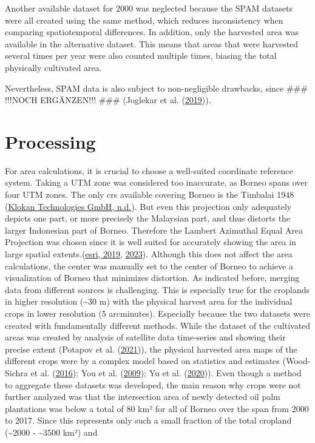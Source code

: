 \documentclass[
  letterpaper,
  DIV=11,
  numbers=noendperiod]{scrreprt}
\begin{document}
Another available dataset for 2000 was neglected because the SPAM
datasets were all created using the same method, which reduces
inconsistency when comparing spatiotemporal differences. In addition,
only the harvested area was available in the alternative dataset. This
means that areas that were harvested several times per year were also
counted multiple times, biasing the total physically cultivated area.

Nevertheless, SPAM data is also subject to non-negligible drawbacks,
since \#\#\# !!!NOCH ERGÄNZEN!!! \#\#\# (Joglekar et al.
(\protect\hyperlink{ref-joglekarPixelatingCropProduction2019}{2019})).

\hypertarget{processing}{%
\section{Processing}\label{processing}}

For area calculations, it is crucial to choose a well-suited coordinate
reference system. Taking a UTM zone was considered too inaccurate, as
Borneo spans over four UTM zones. The only crs available covering Borneo
is the Timbalai 1948
(\protect\hyperlink{ref-klokantechnologiesgmbhTimbalai1948RSO}{Klokan
Technologies GmbH, n.d.}). But even this projection only adequately
depicts one part, or more precisely the Malaysian part, and thus
distorts the larger Indonesian part of Borneo. Therefore the Lambert
Azimuthal Equal Area Projection was chosen since it is well suited for
accurately showing the area in large spatial
extents.(\protect\hyperlink{ref-esriQuick_Notes_on_Map_Projections_in_ArcGIS_nov2019Pdf2019}{esri,
2019}, \protect\hyperlink{ref-esriLambertAzimuthalEqualarea2023}{2023}).
Although this does not affect the area calculations, the center was
manually set to the center of Borneo to achieve a visualization of
Borneo that minimizes distortion. As indicated before, merging data from
different sources is challenging. This is especially true for the
croplands in higher resolution (\textasciitilde30 m) with the physical
harvest area for the individual crops in lower resolution (5
arcminutes). Especially because the two datasets were created with
fundamentally different methods. While the dataset of the cultivated
areas was created by analysis of satellite data time-series and showing
their precise extent (Potapov et al.
(\protect\hyperlink{ref-potapovGlobalMapsCropland2021}{2021})), the
physical harvested area maps of the different crops were by a complex
model based on statistics and estimates (Wood-Sichra et al.
(\protect\hyperlink{ref-wood-sichraSpatialProductionAllocation2016}{2016});
You et al.
(\protect\hyperlink{ref-youGeneratingPlausibleCrop2009}{2009}); Yu et
al. (\protect\hyperlink{ref-yuCultivatedPlanet20102020}{2020})). Even
though a method to aggregate these datasets was developed, the main
reason why crops were not further analyzed was that the intersection
area of newly detected oil palm plantations was below a total of 80 km²
for all of Borneo over the span from 2000 to 2017. Since this represents
only such a small fraction of the total cropland (\textasciitilde2000 -
\textasciitilde3500 km²) and
\end{document}
